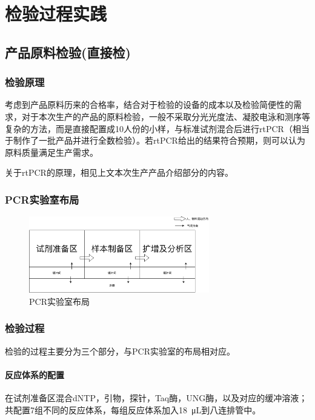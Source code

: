 \documentclass[cn,black,12pt,normal]{elegantnote}
\begin{document}
\section{检验过程实践}

\subsection{产品原料检验(直接检)}

\subsubsection{检验原理}
考虑到产品原料历来的合格率，结合对于检验的设备的成本以及检验简便性的需求，对于本次生产的产品的原料检验，一般不采取分光光度法、凝胶电泳和测序等复杂的方法，而是直接配置成10人份的小样，与标准试剂混合后进行rtPCR（相当于制作了一批产品并进行全数检验）。若rtPCR给出的结果符合预期，则可以认为原料质量满足生产需求。

关于rtPCR的原理，相见上文本次生产产品介绍部分的内容。

\subsubsection{PCR实验室布局}

\begin{figure}[H]
    \centering
    \includegraphics[width=0.7\textwidth]{image/PCR_Lab_Layout.png}
    \caption{PCR实验室布局}
    \label{PCR}
\end{figure}

\subsubsection{检验过程}

检验的过程主要分为三个部分，与PCR实验室的布局相对应。

\paragraph{反应体系的配置} 在试剂准备区混合dNTP，引物，探针，Taq酶，UNG酶，以及对应的缓冲溶液；共配置7组不同的反应体系，每组反应体系加入\SI{18}{\micro\liter}到八连排管中。
\end{document}
